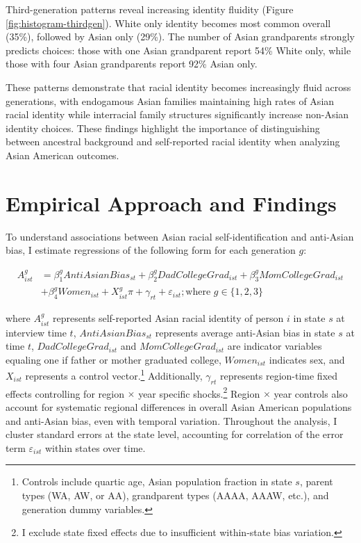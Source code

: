 Third-generation patterns reveal increasing identity fluidity (Figure \ref{fig:histogram-thirdgen}). White only identity becomes most common overall (35\%), followed by Asian only (29\%). The number of Asian grandparents strongly predicts choices: those with one Asian grandparent report 54\% White only, while those with four Asian grandparents report 92\% Asian only.

These patterns demonstrate that racial identity becomes increasingly fluid across generations, with endogamous Asian families maintaining high rates of Asian racial identity while interracial family structures significantly increase non-Asian identity choices. These findings highlight the importance of distinguishing between ancestral background and self-reported racial identity when analyzing Asian American outcomes.

\section{Empirical Approach and Findings}\label{sec:empstrat}

To understand associations between Asian racial self-identification and anti-Asian bias, I estimate regressions of the following form for each generation $g$:

\begin{align}
A_{ist}^g &= \beta_1^g AntiAsianBias_{st} + \beta_2^g DadCollegeGrad_{ist} + \beta_3^g MomCollegeGrad_{ist} \nonumber \\ 
            &+ \beta_4^g Women_{ist} + X_{ist}^g\pi + \gamma_{rt} 
           + \varepsilon_{ist}; 
           \text{where } g \in \{1,2,3\} \label{eq:identity_reg_bias}
\end{align}

where $A_{ist}^g$ represents self-reported Asian racial identity of person $i$ in state $s$ at interview time $t$, $AntiAsianBias_{st}$ represents average anti-Asian bias in state $s$ at time $t$, $DadCollegeGrad_{ist}$ and $MomCollegeGrad_{ist}$ are indicator variables equaling one if father or mother graduated college, $Women_{ist}$ indicates sex, and $X_{ist}$ represents a control vector.\footnote{Controls include quartic age, Asian population fraction in state $s$, parent types (WA, AW, or AA), grandparent types (AAAA, AAAW, etc.), and generation dummy variables.} Additionally, $\gamma_{rt}$ represents region-time fixed effects controlling for region $\times$ year specific shocks.\footnote{I exclude state fixed effects due to insufficient within-state bias variation.} Region $\times$ year controls also account for systematic regional differences in overall Asian American populations and anti-Asian bias, even with temporal variation. Throughout the analysis, I cluster standard errors at the state level, accounting for correlation of the error term $\varepsilon_{ist}$ within states over time.

